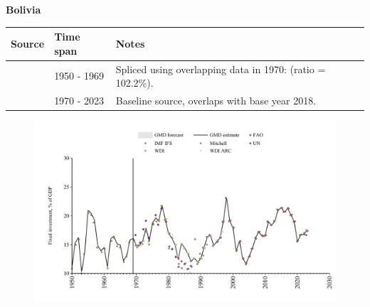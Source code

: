 \documentclass[12pt,a4paper,landscape]{article}
\begin{document}
\begin{adjustbox}{max totalsize={\paperwidth}{\paperheight},center}
\begin{minipage}[t][\textheight][t]{\textwidth}
\vspace*{0.5cm}
{}
\begin{center}
{\Large\bfseries Bolivia}
\end{center}
\vspace{0.5cm}
\begin{table}[H]
\centering
\small
\begin{tabular}{|l|l|l|}
\hline
\textbf{Source} & \textbf{Time span} & \textbf{Notes} \\
\hline
\rowcolor{white}\cite{Mitchell}& 1950 - 1969 &Spliced using overlapping data in 1970: (ratio = 102.2\%).\\
\rowcolor{lightgray}\cite{WDI}& 1970 - 2023 &Baseline source, overlaps with base year 2018.\\
\hline
\end{tabular}
\end{table}
\begin{figure}[H]
\centering
\includegraphics[width=\textwidth,height=0.6\textheight,keepaspectratio]{graphs/BOL_finv_GDP.pdf}
\end{figure}
\end{minipage}
\end{adjustbox}
\end{document}
